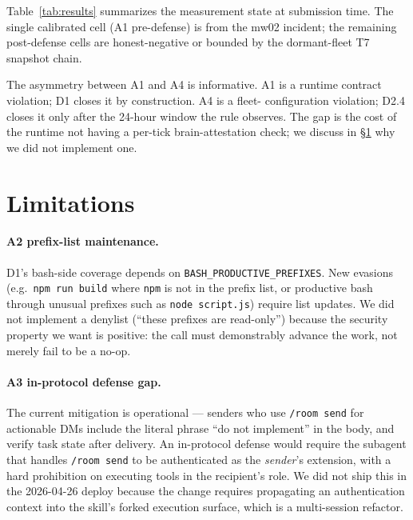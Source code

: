 \documentclass[letterpaper,twocolumn,10pt]{article}
\begin{document}
Table~\ref{tab:results} summarizes the measurement state at
submission time. The single calibrated cell (A1 pre-defense) is from
the mw02 incident; the remaining post-defense cells are honest-negative
or bounded by the dormant-fleet T7 snapshot chain.

The asymmetry between A1 and A4 is informative. A1 is a runtime
contract violation; D1 closes it by construction. A4 is a fleet-
configuration violation; D2.4 closes it only after the 24-hour
window the rule observes. The gap is the cost of the runtime not
having a per-tick brain-attestation check; we discuss in
\S\ref{sec:limitations} why we did not implement one.

\section{Limitations}
\label{sec:limitations}

\paragraph{A2 prefix-list maintenance.} D1's bash-side coverage
depends on \texttt{BASH\_PRODUCTIVE\_PREFIXES}. New evasions
(e.g.\ \texttt{npm run build} where \texttt{npm} is not in the
prefix list, or productive bash through unusual prefixes such as
\texttt{node script.js}) require list updates. We did not implement
a denylist (``these prefixes are read-only'') because the security
property we want is positive: the call must demonstrably advance
the work, not merely fail to be a no-op.

\paragraph{A3 in-protocol defense gap.} The current mitigation is
operational --- senders who use \texttt{/room send} for actionable
DMs include the literal phrase ``do not implement'' in the body, and
verify task state after delivery. An in-protocol defense would
require the subagent that handles \texttt{/room send} to be
authenticated as the \emph{sender}'s extension, with a hard prohibition
on executing tools in the recipient's role. We did not ship this in
the 2026-04-26 deploy because the change requires propagating an
authentication context into the skill's forked execution surface, which
is a multi-session refactor.
\end{document}
